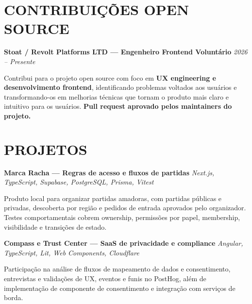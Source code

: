 \documentclass[10pt,a4paper]{article}
\begin{document}

\section*{CONTRIBUIÇÕES OPEN SOURCE}

\noindent
\textbf{Stoat / Revolt Platforms LTD — Engenheiro Frontend Voluntário}
\hfill
\textit{2026 -- Presente}

\footnotesize

Contribui para o projeto open source com foco em
\textbf{UX engineering e desenvolvimento frontend}, identificando
problemas voltados aos usuários e transformando-os em melhorias
técnicas que tornam o produto mais claro e intuitivo para os
usuários.
\textbf{Pull request aprovado pelos maintainers do projeto.}


\section*{PROJETOS}

\noindent
\textbf{Marca Racha — Regras de acesso e fluxos de partidas}
\hfill
\textit{Next.js, TypeScript, Supabase, PostgreSQL, Prisma, Vitest}

\footnotesize

Produto local para organizar partidas amadoras, com partidas públicas e privadas, descoberta por região e pedidos de entrada aprovados pelo organizador. Testes comportamentais cobrem ownership, permissões por papel, membership, visibilidade e transições de estado.

\vspace{0.5pt}

\noindent
\textbf{Compass e Trust Center — SaaS de privacidade e compliance}
\hfill
\textit{Angular, TypeScript, Lit, Web Components, Cloudflare}

\footnotesize

Participação na análise de fluxos de mapeamento de dados e consentimento, entrevistas e validações de UX, eventos e funis no PostHog, além de implementação de componente de consentimento e integração com serviços de borda.

\vspace{0.5pt}
\end{document}
